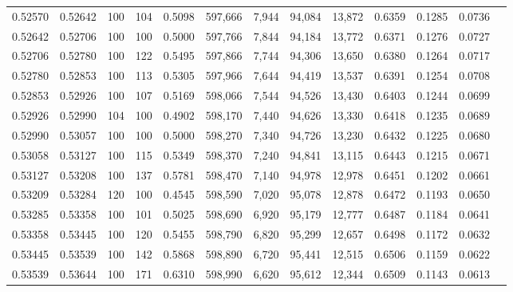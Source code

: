 \begin{tabular}{rrrrrrrrrrrrr}
0.52570 & 0.52642 &    100 & 104 &                                     0.5098 & 597,666 &   7,944 &  94,084 &  13,872 & 0.6359 & 0.1285 & 0.0736 \\
0.52642 & 0.52706 &    100 & 100 &                                     0.5000 & 597,766 &   7,844 &  94,184 &  13,772 & 0.6371 & 0.1276 & 0.0727 \\
0.52706 & 0.52780 &    100 & 122 &                                     0.5495 & 597,866 &   7,744 &  94,306 &  13,650 & 0.6380 & 0.1264 & 0.0717 \\
0.52780 & 0.52853 &    100 & 113 &                                     0.5305 & 597,966 &   7,644 &  94,419 &  13,537 & 0.6391 & 0.1254 & 0.0708 \\
0.52853 & 0.52926 &    100 & 107 &                                     0.5169 & 598,066 &   7,544 &  94,526 &  13,430 & 0.6403 & 0.1244 & 0.0699 \\
0.52926 & 0.52990 &    104 & 100 &                                     0.4902 & 598,170 &   7,440 &  94,626 &  13,330 & 0.6418 & 0.1235 & 0.0689 \\
0.52990 & 0.53057 &    100 & 100 &                                     0.5000 & 598,270 &   7,340 &  94,726 &  13,230 & 0.6432 & 0.1225 & 0.0680 \\
0.53058 & 0.53127 &    100 & 115 &                                     0.5349 & 598,370 &   7,240 &  94,841 &  13,115 & 0.6443 & 0.1215 & 0.0671 \\
0.53127 & 0.53208 &    100 & 137 &                                     0.5781 & 598,470 &   7,140 &  94,978 &  12,978 & 0.6451 & 0.1202 & 0.0661 \\
0.53209 & 0.53284 &    120 & 100 &                                     0.4545 & 598,590 &   7,020 &  95,078 &  12,878 & 0.6472 & 0.1193 & 0.0650 \\
0.53285 & 0.53358 &    100 & 101 &                                     0.5025 & 598,690 &   6,920 &  95,179 &  12,777 & 0.6487 & 0.1184 & 0.0641 \\
0.53358 & 0.53445 &    100 & 120 &                                     0.5455 & 598,790 &   6,820 &  95,299 &  12,657 & 0.6498 & 0.1172 & 0.0632 \\
0.53445 & 0.53539 &    100 & 142 &                                     0.5868 & 598,890 &   6,720 &  95,441 &  12,515 & 0.6506 & 0.1159 & 0.0622 \\
0.53539 & 0.53644 &    100 & 171 &                                     0.6310 & 598,990 &   6,620 &  95,612 &  12,344 & 0.6509 & 0.1143 & 0.0613 \\

\end{tabular}
